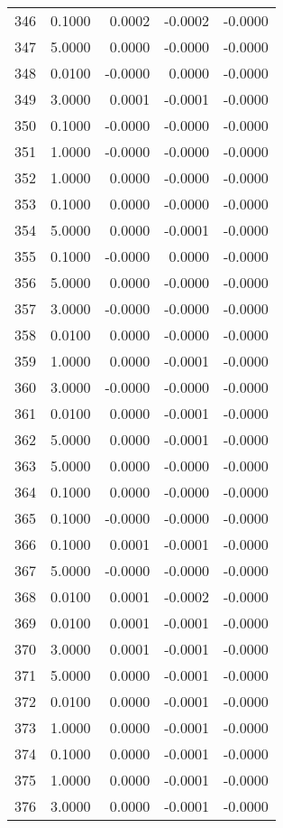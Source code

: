\begin{longtable}{lrrrr}
346 & 0.1000 & 0.0002 & -0.0002 & -0.0000 \\
347 & 5.0000 & 0.0000 & -0.0000 & -0.0000 \\
348 & 0.0100 & -0.0000 & 0.0000 & -0.0000 \\
349 & 3.0000 & 0.0001 & -0.0001 & -0.0000 \\
350 & 0.1000 & -0.0000 & -0.0000 & -0.0000 \\
351 & 1.0000 & -0.0000 & -0.0000 & -0.0000 \\
352 & 1.0000 & 0.0000 & -0.0000 & -0.0000 \\
353 & 0.1000 & 0.0000 & -0.0000 & -0.0000 \\
354 & 5.0000 & 0.0000 & -0.0001 & -0.0000 \\
355 & 0.1000 & -0.0000 & 0.0000 & -0.0000 \\
356 & 5.0000 & 0.0000 & -0.0000 & -0.0000 \\
357 & 3.0000 & -0.0000 & -0.0000 & -0.0000 \\
358 & 0.0100 & 0.0000 & -0.0000 & -0.0000 \\
359 & 1.0000 & 0.0000 & -0.0001 & -0.0000 \\
360 & 3.0000 & -0.0000 & -0.0000 & -0.0000 \\
361 & 0.0100 & 0.0000 & -0.0001 & -0.0000 \\
362 & 5.0000 & 0.0000 & -0.0001 & -0.0000 \\
363 & 5.0000 & 0.0000 & -0.0000 & -0.0000 \\
364 & 0.1000 & 0.0000 & -0.0000 & -0.0000 \\
365 & 0.1000 & -0.0000 & -0.0000 & -0.0000 \\
366 & 0.1000 & 0.0001 & -0.0001 & -0.0000 \\
367 & 5.0000 & -0.0000 & -0.0000 & -0.0000 \\
368 & 0.0100 & 0.0001 & -0.0002 & -0.0000 \\
369 & 0.0100 & 0.0001 & -0.0001 & -0.0000 \\
370 & 3.0000 & 0.0001 & -0.0001 & -0.0000 \\
371 & 5.0000 & 0.0000 & -0.0001 & -0.0000 \\
372 & 0.0100 & 0.0000 & -0.0001 & -0.0000 \\
373 & 1.0000 & 0.0000 & -0.0001 & -0.0000 \\
374 & 0.1000 & 0.0000 & -0.0001 & -0.0000 \\
375 & 1.0000 & 0.0000 & -0.0001 & -0.0000 \\
376 & 3.0000 & 0.0000 & -0.0001 & -0.0000 \\

\end{longtable}
